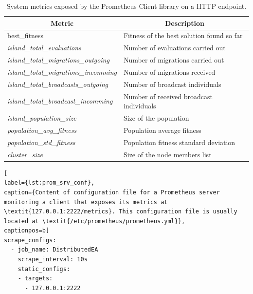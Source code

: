 \begin{table}[h]
\begin{tabular}{|l|l|}
\hline
\multicolumn{1}{|c|}{\textbf{Metric}}         & \multicolumn{1}{c|}{\textbf{Description}}  \\ \hline
best\_fitness                                 & Fitness of the best solution found so far  \\ \hline
\textit{island\_total\_evaluations}           & Number of evaluations carried out          \\ \hline
\textit{island\_total\_migrations\_outgoing}  & Number of migrations carried out           \\ \hline
\textit{island\_total\_migrations\_incomming} & Number of migrations received              \\ \hline
\textit{island\_total\_broadcasts\_outgoing}  & Number of broadcast individuals            \\ \hline
\textit{island\_total\_broadcast\_incomming}  & Number of received broadcast individuals   \\ \hline
\textit{island\_population\_size}             & Size of the population                     \\ \hline
\textit{population\_avg\_fitness}             & Population average fitness                 \\ \hline
\textit{population\_std\_fitness}             & Population fitness standard deviation      \\ \hline
\textit{cluster\_size}                        & Size of the node members list              \\ \hline
\end{tabular}
\caption{System metrics exposed by the Prometheus Client library on a HTTP endpoint.}
\label{tab:metrics}
\end{table}

\begin{lstlisting}[
label={lst:prom_srv_conf},
caption={Content of configuration file for a Prometheus server monitoring a client that exposes its metrics at \textit{127.0.0.1:2222/metrics}. This configuration file is usually located at \textit{/etc/prometheus/prometheus.yml}},
captionpos=b]
scrape_configs:
  - job_name: DistributedEA
    scrape_interval: 10s
    static_configs:
    - targets:
      - 127.0.0.1:2222
\end{lstlisting}

